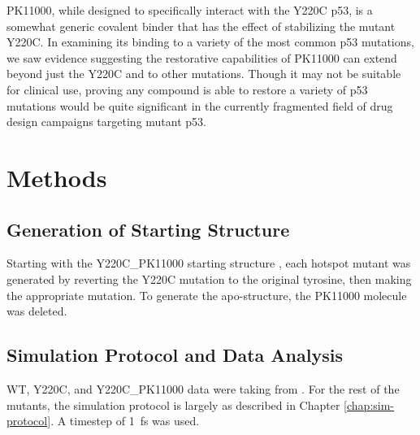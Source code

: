 PK11000, while designed to specifically interact with the Y220C p53, is a somewhat generic covalent binder that has the effect of stabilizing the mutant Y220C. In examining its binding to a variety of the most common p53 mutations, we saw evidence suggesting the restorative capabilities of PK11000 can extend beyond just the Y220C and to other mutations. Though it may not be suitable for clinical use, proving any compound is able to restore a variety of p53 mutations would be quite significant in the currently fragmented field of drug design campaigns targeting mutant p53.

\section{Methods}

\subsection{Generation of Starting Structure}

Starting with the Y220C\_PK11000 starting structure \parencite{stetsonRestorationY220CP532025}, each hotspot mutant was generated by reverting the Y220C mutation to the original tyrosine, then making the appropriate mutation. To generate the apo-structure, the PK11000 molecule was deleted.

\subsection{Simulation Protocol and Data Analysis}

WT, Y220C, and Y220C\_PK11000 data were taking from \parencite{stetsonRestorationY220CP532025}. For the rest of the mutants, the simulation protocol is largely as described in Chapter \ref{chap:sim-protocol}. A timestep of \qty{1}{\femto\second} was used.